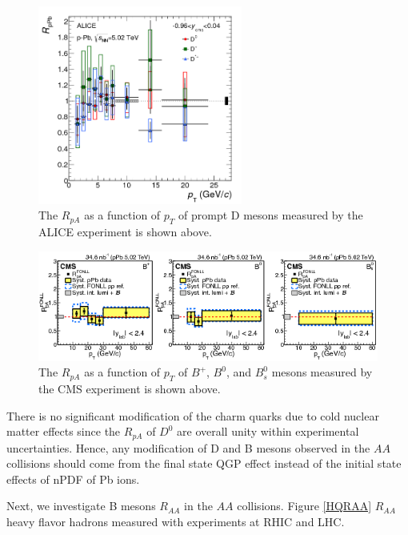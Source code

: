 \begin{figure}[hbtp]
\begin{center}
\includegraphics[width=0.60\textwidth]{Figures/Chapter2/ALICEDRpA.png}
\caption{The $R_{pA}$ as a function of $p_T$ of prompt D mesons measured by the ALICE experiment is shown above.}
\label{DRPA}
\end{center}
\end{figure}   

\begin{figure}[hbtp]
\begin{center}
\includegraphics[width=1.10\textwidth]{Figures/Chapter2/CMSDRpA.png}
\caption{The $R_{pA}$ as a function of $p_T$ of $B^+$, $B^0$, and $B^0_s$ mesons measured by the CMS experiment is shown above.}
\label{BRPA}
\end{center}
\end{figure}   

There is no significant modification of the charm quarks due to cold nuclear matter effects since the $R_{pA}$ of $D^0$ are overall unity within experimental uncertainties. Hence, any modification of D and B mesons observed in the $AA$ collisions should come from the final state QGP effect instead of the initial state effects of nPDF of Pb ions. 

Next, we investigate B mesons $R_{AA}$ in the $AA$ collisions. Figure \ref{HQRAA} $R_{AA}$ heavy flavor hadrons measured with experiments at RHIC and LHC.

